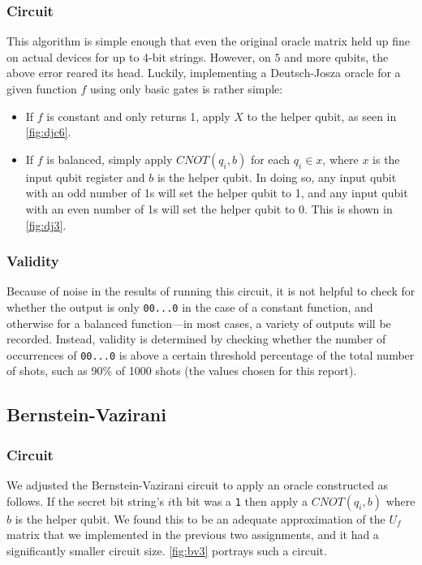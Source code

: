 \documentclass[12pt]{article}
\begin{document}
\subsubsection*{Circuit}
This algorithm is simple enough that even the original oracle matrix held up fine on actual devices for up to 4-bit strings.
However, on $5$ and more qubits, the above error reared its head.
Luckily, implementing a Deutsch-Josza oracle for a given function $f$ using only basic gates is rather simple:
\begin{itemize}
    \item If $f$ is constant and only returns 1, apply $X$ to the helper qubit, as seen in \autoref{fig:djc6}.
    \item If $f$ is balanced, simply apply $CNOT(q_i, b)$ for each $q_i \in x$, where $x$ is the input qubit register and $b$ is the helper qubit.
        In doing so, any input qubit with an odd number of 1s will set the helper qubit to 1, and any input qubit with an even number of 1s will set the helper qubit to 0.
        This is shown in \autoref{fig:dj3}.
\end{itemize}

\subsubsection*{Validity}
Because of noise in the results of running this circuit, it is not helpful to check for whether the output is only \texttt{00...0} in the case of a constant function, and otherwise for a balanced function---in most cases, a variety of outputs will be recorded.
Instead, validity is determined by checking whether the number of occurrences of \texttt{00...0} is above a certain threshold percentage of the total number of shots, such as 90\% of 1000 shots (the values chosen for this report).

\subsection{Bernstein-Vazirani}

\subsubsection*{Circuit}
We adjusted the Bernstein-Vazirani circuit to apply an oracle constructed as follows.
If the secret bit string’s $i$th bit was a \texttt{1} then apply a $CNOT(q_i, b)$ where $b$ is the helper qubit.
We found this to be an adequate approximation of the $U_f$ matrix that we implemented in the previous two assignments, and it had a significantly smaller circuit size.
\autoref{fig:bv3} portrays such a circuit.
\end{document}
